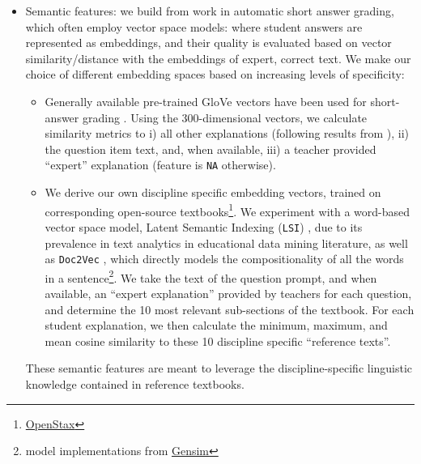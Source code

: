 \documentclass[notitlepage,12pt]{jedm}
\begin{document}
\begin{itemize}
	\item Semantic features: we build from work in automatic short answer 
	grading, which often employ vector space models: where student answers are 
	represented as embeddings, and their quality is evaluated based on vector 
	similarity/distance with the embeddings of expert, correct text.
	We make our choice of different embedding spaces based on increasing levels 
	of specificity:  
	\begin{itemize}
		\item Generally available pre-trained GloVe 
		vectors\cite{pennington_glove:_2014} have been used for short-answer 
		grading \cite{magooda_vector_2016,riordan_investigating_2017}. 
		Using the 300-dimensional vectors, we calculate similarity metrics to 
		i) all other explanations (following results from 
		\cite{gagnon_filtering_2019}), 
		ii) the question item text, and, when available, 
		iii) a teacher provided ``expert'' explanation (feature is \verb|NA| 
		otherwise).
		\item We derive our own discipline specific embedding vectors, trained 
		on corresponding open-source 
		textbooks\footnote{\href{https://openstax.org}{OpenStax}}. 
		We experiment with a word-based vector space model, Latent Semantic 
		Indexing (\verb|LSI|) \cite{deerwester_indexing_1990}, due to its 
		prevalence in text analytics in educational data mining literature, as 
		well as \verb|Doc2Vec| \cite{le_distributed_2014}, which directly 
		models the compositionality of all the words in a 
		sentence\footnote{model implementations from 
		\href{https://radimrehurek.com/gensim/index.html}{Gensim}}.
		We take the text of the question prompt, and when available, an 
		``expert explanation'' provided by teachers for each question, and 
		determine the 10 most relevant sub-sections of the textbook.
		For each student explanation, we then calculate the minimum, maximum, 
		and mean cosine similarity to these 10 discipline specific ``reference 
		texts''.
	\end{itemize}

	These semantic features are meant to leverage the discipline-specific 
	linguistic knowledge contained in reference textbooks.  
		
	

\end{itemize}
\end{document}
